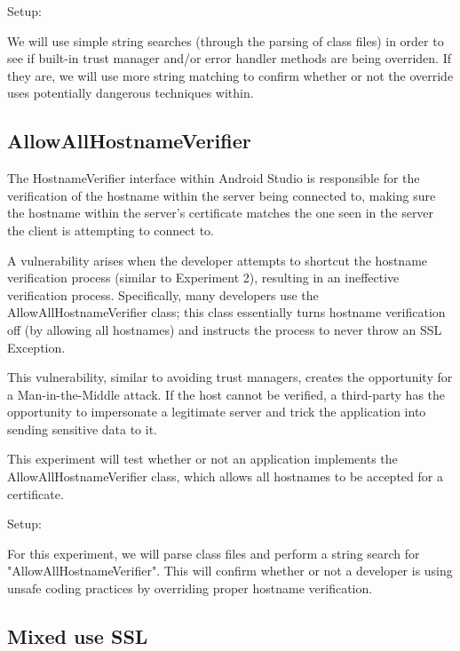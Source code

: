         Setup:

        We will use simple string searches (through the parsing of class files) in
        order to see if built-in trust manager and/or error handler methods are being overriden.
        If they are, we will use more string matching to confirm whether or not the override
        uses potentially dangerous techniques within.

    \subsection{AllowAllHostnameVerifier}
    
        The HostnameVerifier interface within Android Studio is responsible for the 
        verification of the hostname within the server being connected to, making 
        sure the hostname within the server's certificate matches the one 
        seen in the server the client is attempting to connect to. 

        A vulnerability arises when the developer attempts to shortcut the 
        hostname verification process (similar to Experiment 2), resulting 
        in an ineffective verification process. Specifically, many 
        developers use the AllowAllHostnameVerifier class; this class 
        essentially turns hostname verification off (by allowing all 
        hostnames) and instructs the process to never throw an SSL 
        Exception.

        This vulnerability, similar to avoiding trust managers, creates 
        the opportunity for a Man-in-the-Middle attack. If the host 
        cannot be verified, a third-party has the opportunity to impersonate
        a legitimate server and trick the application into sending 
        sensitive data to it.

        This experiment will test whether or not an application 
        implements the AllowAllHostnameVerifier class, which allows 
        all hostnames to be accepted for a certificate.

        Setup:

        For this experiment, we will parse class files and perform a string
        search for "AllowAllHostnameVerifier". This will confirm whether or not
        a developer is using unsafe coding practices by overriding proper hostname 
        verification.


    \subsection{Mixed use SSL}

